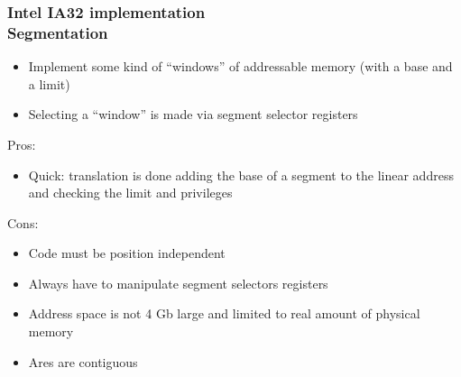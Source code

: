 \begin{frame}
  \frametitle{Intel IA32 implementation\\Segmentation}

  \begin{itemize}
  \item Implement some kind of ``windows'' of addressable memory (with a base and a limit)
  \item Selecting a ``window'' is made via segment selector registers
  \end{itemize}

  \nl

  Pros:

  \begin{itemize}
  \item Quick: translation is done adding the base of a segment to the linear address and checking the limit and privileges
  \end{itemize}

  Cons:

  \begin{itemize}
  \item Code must be position independent
  \item Always have to manipulate segment selectors registers
  \item Address space is not 4 Gb large and limited to real amount of physical memory
  \item Ares are contiguous
  \end{itemize}

\end{frame}


